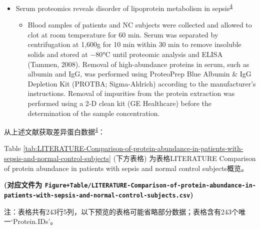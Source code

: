 \documentclass[
]{article}
\providecommand{\tightlist}{%
  \setlength{\itemsep}{0pt}\setlength{\parskip}{0pt}}
\begin{document}
\begin{itemize}
\tightlist
\item
  Serum proteomics reveals disorder of lipoprotein metabolism in
  sepsis\textsuperscript{\protect\hyperlink{ref-SerumProteomicLiang2021}{4}}

  \begin{itemize}
  \tightlist
  \item
    Blood samples of patients and NC subjects were collected and allowed to
    clot at room temperature for 60 min. Serum was separated by
    centrifugation at 1,600g for 10 min within 30 min to remove insoluble
    solids and stored at −80°C until proteomic analysis and ELISA (Tammen,
    2008). Removal of high-abundance proteins in serum, such as albumin and
    IgG, was performed using ProteoPrep Blue Albumin \& IgG Depletion Kit
    (PROTBA; Sigma-Aldrich) according to the manufacturer's instructions.
    Removal of impurities from the protein extraction was performed using a
    2-D clean kit (GE Healthcare) before the determination of the sample
    concentration.
  \end{itemize}
\end{itemize}

从上述文献获取差异蛋白数据\textsuperscript{\protect\hyperlink{ref-SerumProteomicLiang2021}{4}}：

Table \ref{tab:LITERATURE-Comparison-of-protein-abundance-in-patients-with-sepsis-and-normal-control-subjects} (下方表格) 为表格LITERATURE Comparison of protein abundance in patients with sepsis and normal control subjects概览。

\textbf{(对应文件为 \texttt{Figure+Table/LITERATURE-Comparison-of-protein-abundance-in-patients-with-sepsis-and-normal-control-subjects.csv})}

\begin{center}\begin{tcolorbox}[colback=gray!10, colframe=gray!50, width=0.9\linewidth, arc=1mm, boxrule=0.5pt]注：表格共有243行5列，以下预览的表格可能省略部分数据；表格含有243个唯一`Protein.IDs'。
\end{tcolorbox}
\end{center}
\end{document}
